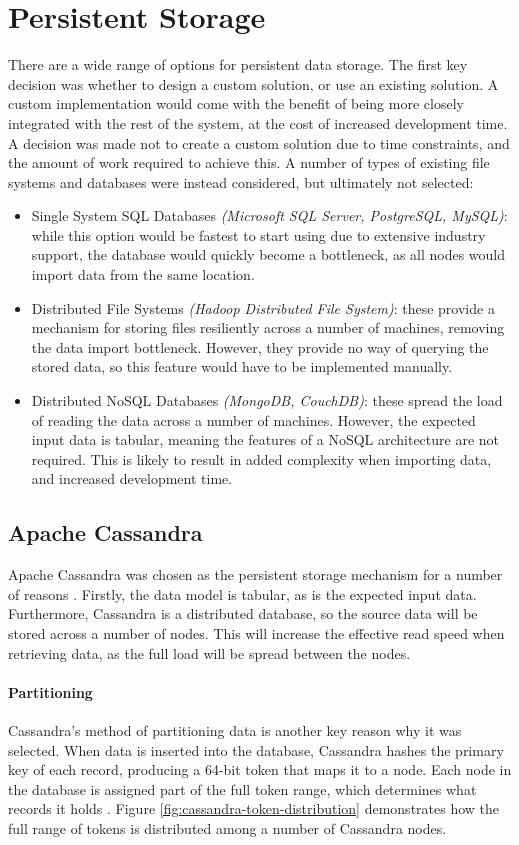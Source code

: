 \section{Persistent Storage}
There are a wide range of options for persistent data storage. The first key decision was whether to design a custom solution, or use an existing solution. A custom implementation would come with the benefit of being more closely integrated with the rest of the system, at the cost of increased development time. A decision was made not to create a custom solution due to time constraints, and the amount of work required to achieve this. A number of types of existing file systems and databases were instead considered, but ultimately not selected:
\begin{itemize}
	\item Single System SQL Databases \textit{(Microsoft SQL Server, PostgreSQL, MySQL)}: while this option would be fastest to start using due to extensive industry support, the database would quickly become a bottleneck, as all nodes would import data from the same location.
	\item Distributed File Systems \textit{(Hadoop Distributed File System)}: these provide a mechanism for storing files resiliently across a number of machines, removing the data import bottleneck. However, they provide no  way of querying the stored data, so this feature would have to be implemented manually.
	\item Distributed NoSQL Databases \textit{(MongoDB, CouchDB)}: these spread the load of reading the data across a number of machines. However, the expected input data is tabular, meaning the features of a NoSQL architecture are not required. This is likely to result in added complexity when importing data, and increased development time.
\end{itemize}

\subsection{Apache Cassandra} 
Apache Cassandra was chosen as the persistent storage mechanism for a number of reasons \cite{lakshman2010cassandra}. Firstly, the data model is tabular, as is the expected input data. Furthermore, Cassandra is a distributed database, so the source data will be stored across a number of nodes. This will increase the effective read speed when retrieving data, as the full load will be spread between the nodes.

\paragraph{Partitioning} Cassandra's method of partitioning data is another key reason why it was selected. When data is inserted into the database, Cassandra hashes the primary key of each record, producing a 64-bit token that maps it to a node. Each node in the database is assigned part of the full token range, which determines what records it holds \cite{lakshman2010cassandra}. Figure \ref{fig:cassandra-token-distribution} demonstrates how the full range of tokens is distributed among a number of Cassandra nodes.

